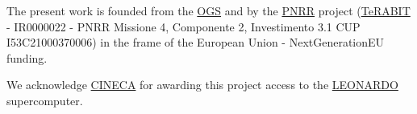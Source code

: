 \label{chap:Acknowledgement}
The present work is founded from the \href{https://www.ogs.it/en}{\ac{OGS}} and
by the
\href{https://www.italiadomani.gov.it/content/sogei-ng/it/en/home.html}{\ac{PNRR}}
project (\href{https://www.terabit-project.it/en/}{\ac{TeRABIT}} - IR0000022 -
PNRR Missione 4, Componente 2, Investimento 3.1 CUP I53C21000370006) in the
frame of the European Union - NextGenerationEU funding.

We acknowledge \href{https://www.cineca.it/en}{CINECA} for awarding this
project access to the
\href{https://wiki.u-gov.it/confluence/display/SCAIUS/UG3.2.1\%3A+LEONARDO+Booster+UserGuide}{LEONARDO}
supercomputer.